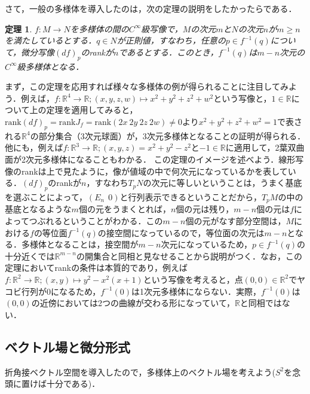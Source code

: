 \documentclass{jsarticle}
\def\realnum{{\mathbb R}}
\def\rank{{\mathrm{rank}}}
\newtheorem{theo}{定理}
\begin{document}
さて，一般の多様体を導入したのは，次の定理の説明をしたかったらである．
\begin{theo}
$f:M\rightarrow N$を多様体の間の$C^\infty$級写像で，$M$の次元$m$と$N$の次元$n$が$m\ge n$を満たしているとする．$q\in N$が正則値，すなわち，任意の$p\in f^{-1}(q)$について，微分写像$(df)_p$のrankが$n$であるとする．このとき，$f^{-1}(q)$は$m-n$次元の$C^{\infty}$級多様体となる．
\end{theo}
まず，この定理を応用すれば様々な多様体の例が得られることに注目してみよう．例えば，$f:\realnum^4 \rightarrow \realnum;(x,y,z,w)\mapsto x^2+y^2+z^2+w^2$という写像と，$1\in \realnum$について上の定理を適用してみると，$\rank(df)_p=\rank J_{f}=\rank(2x\:2y\:2z\:2w)\neq 0$より$x^2+y^2+z^2+w^2=1$で表される$\realnum^4$の部分集合（3次元球面）が，3次元多様体となることの証明が得られる．他にも，例えば$f:\realnum^3\rightarrow \realnum;(x,y,z)=x^2+y^2-z^2$と$-1\in\realnum$に適用して，2葉双曲面が2次元多様体になることもわかる．
この定理のイメージを述べよう．線形写像のrankは上で見たように，像が値域の中で何次元になっているかを表している．$(df)_p$のrankが$n$，すなわち$T_pN$の次元に等しいということは，うまく基底を選ぶことによって，$(E_n\:\:0)$と行列表示できるということだから，$T_pM$の中の基底となるような$m$個の元をうまくとれば，$n$個の元は残り，$m-n$個の元は$f$によってつぶれるということがわかる．この$m-n$個の元がなす部分空間は，$M$における$f$の等位面$f^{-1}(q)$の接空間になっているので，等位面の次元は$m-n$となる．多様体となることは，接空間が$m-n$次元になっているため，$p\in f^{-1}(q)$の十分近くでは$\realnum^{m-n}$の開集合と同相と見なせることから説明がつく．なお，この定理においてrankの条件は本質的であり，例えば$f:\realnum^2\rightarrow\realnum;(x,y)\mapsto y^2-x^2(x+1)$という写像を考えると，点$(0,0)\in\realnum^2$でヤコビ行列が0になるため，$f^{-1}(0)$は1次元多様体にならない．実際，$f^{-1}(0)$は$(0,0)$の近傍においては2つの曲線が交わる形になっていて，$\realnum$と同相ではない．


\subsection{ベクトル場と微分形式}
折角接ベクトル空間を導入したので，多様体上のベクトル場を考えよう($S^2$を念頭に置けば十分である)．
\end{document}
